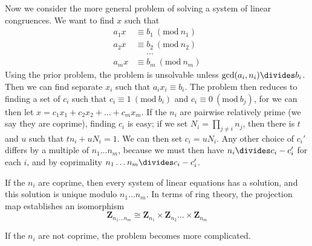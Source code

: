 Now we consider the more general problem of solving a system of linear congruences. We want to find $x$ such that
%
\begin{align*}
    a_1x &\equiv b_1\ (\text{mod}\ n_1)\\
    a_2x &\equiv b_2\ (\text{mod}\ n_2)\\
    &\ \ \ \ \ \ \dots\\
    a_mx &\equiv b_m\ (\text{mod}\ n_m)
\end{align*}
%
Using the prior problem, the problem is unsolvable unless $\gcd(a_i, n_i) \divides b_i$. Then we can find separate $x_i$ such that $a_ix_i \equiv b_i$. The problem then reduces to finding a set of $c_i$ such that $c_i \equiv 1\ (\text{mod}\ b_i)$ and $c_i \equiv 0\ (\text{mod}\ b_j)$, for we can then let $x = c_1 x_1 + c_2 x_2 + \dots + c_m x_m$. If the $n_i$ are pairwise relatively prime (we say they are coprime), finding $c_i$ is easy; if we set $N_i = \prod_{j \neq i} n_j$, then there is $t$ and $u$ such that $tn_i + uN_i = 1$. We can then set $c_i = uN_i$. Any other choice of $c_i'$ differs by a multiple of $n_1 \dots n_m$, because we must then have $n_i \divides c_i - c_i'$ for each $i$, and by coprimality $n_1 \dots n_m \divides c_i - c_i'$.

\begin{theorem}
    If the $n_i$ are coprime, then every system of linear equations has a solution, and this solution is unique modulo $n_1 \dots n_m$. In terms of ring theory, the projection map establishes an isomorphism
    \[ \mathbf{Z}_{n_1 \dots n_m} \cong \mathbf{Z}_{n_1} \times \mathbf{Z}_{n_2} \dots \times \mathbf{Z}_{n_m} \]
\end{theorem}

If the $n_i$ are not coprime, the problem becomes more complicated.

